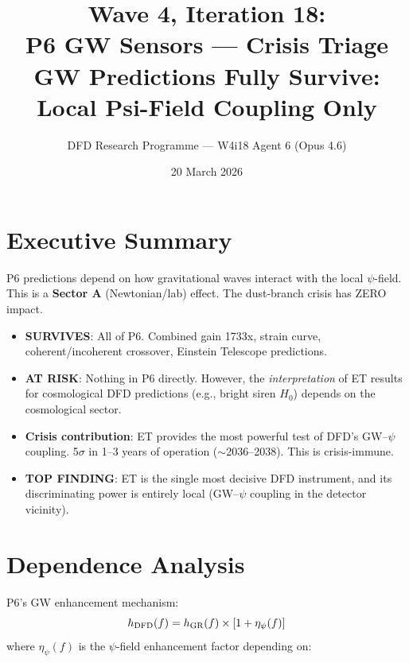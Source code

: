 \documentclass[11pt]{article}
\title{\textbf{Wave 4, Iteration 18:}\\
\textbf{P6 GW Sensors --- Crisis Triage}\\[6pt]
{\large GW Predictions Fully Survive: Local Psi-Field Coupling Only}}
\author{DFD Research Programme --- W4i18 Agent 6 (Opus 4.6)}
\date{20 March 2026}
\begin{document}
\maketitle

\section*{Executive Summary}

\begin{tcolorbox}[colback=green!5!white, colframe=green!70!black,
  title=\textbf{W4i18: P6 FULLY SURVIVES}]

P6 predictions depend on how gravitational waves interact with the local
$\psi$-field. This is a \textbf{Sector A} (Newtonian/lab) effect. The
dust-branch crisis has ZERO impact.

\begin{itemize}
\item \textbf{SURVIVES}: All of P6. Combined gain 1733x, strain curve,
  coherent/incoherent crossover, Einstein Telescope predictions.
\item \textbf{AT RISK}: Nothing in P6 directly. However, the
  \emph{interpretation} of ET results for cosmological DFD predictions
  (e.g., bright siren $H_0$) depends on the cosmological sector.
\item \textbf{Crisis contribution}: ET provides the most powerful
  test of DFD's GW--$\psi$ coupling. 5$\sigma$ in 1--3 years of
  operation ($\sim$2036--2038). This is crisis-immune.
\item \textbf{TOP FINDING}: ET is the single most decisive DFD
  instrument, and its discriminating power is entirely local
  (GW--$\psi$ coupling in the detector vicinity).
\end{itemize}
\end{tcolorbox}

\section{Dependence Analysis}

P6's GW enhancement mechanism:
\begin{equation}
h_{\rm DFD}(f) = h_{\rm GR}(f) \times \left[1 + \eta_\psi(f)\right]
\end{equation}
where $\eta_\psi(f)$ is the $\psi$-field enhancement factor depending on:
\end{document}
